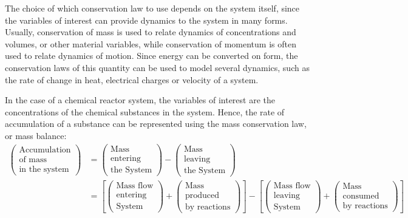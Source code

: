 \documentclass[a4paper,11pt]{book}
\numberwithin{figure}{chapter}
\numberwithin{equation}{chapter}
\numberwithin{table}{chapter}
\theoremstyle{definition}
\begin{document}
The choice of which conservation law to use depends on the system itself, since the variables of interest can provide dynamics to the system in many forms. Usually, conservation of mass is used to relate dynamics of concentrations and volumes, or other material variables, while conservation of momentum is often used to relate dynamics of motion. Since energy can be converted on form, the conservation laws of this quantity can be used to model several dynamics, such as the rate of change in heat, electrical charges or velocity of a system.

In the case of a chemical reactor system, the variables of interest are the concentrations of the chemical substances in the system. Hence, the rate of accumulation of a substance can be represented using the mass conservation law, or mass balance:
\begin{equation}
\begin{split}
	\begin{pmatrix}
		\text{Accumulation} \\ \text{of mass} \\ \text{in the system}
	\end{pmatrix} &= 
	\begin{pmatrix}
		\text{Mass} \\ \text{entering} \\ \text{the System}
	\end{pmatrix} - \begin{pmatrix}
		\text{Mass} \\ \text{leaving} \\ \text{the System}
	\end{pmatrix} \\
	&= \left[ \begin{pmatrix}
		\text{Mass flow} \\ \text{entering} \\ \text{System}
	\end{pmatrix} + \begin{pmatrix}
		\text{Mass} \\  \text{produced} \\ \text{by reactions}
	\end{pmatrix} \right] - \left[ \begin{pmatrix}
		\text{Mass flow} \\ \text{leaving} \\ \text{System}
	\end{pmatrix} + \begin{pmatrix}
		\text{Mass} \\ \text{consumed} \\ \text{by reactions}
	\end{pmatrix} \right]
\end{split}
\end{equation}
\end{document}
